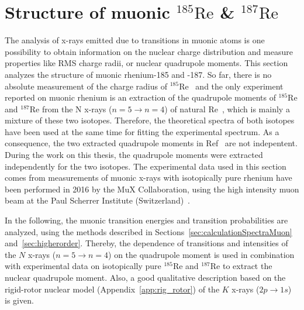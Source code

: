 \section{Structure of muonic $^{185}\text{Re}$ \& $^{187}\text{Re}$}
\label{sec:muon_re}
The analysis of x-rays emitted due to transitions in muonic atoms is one possibility to obtain information on the nuclear charge distribution and measure properties like RMS charge radii, or nuclear quadrupole moments. This section analyzes the structure of muonic rhenium-185 and -187. So far, there is no absolute measurement of the charge radius of $^{185}$Re~\cite{schopper2004} and the only experiment reported on muonic rhenium is an extraction of the quadrupole moments of $^{185}$Re and $^{187}$Re from the N x-rays (${n}{=}{5}\rightarrow{n}{=}{4}$) of natural Re~\cite{konijn1979}, which is mainly a mixture of these two isotopes. Therefore, the theoretical spectra of both isotopes have been used at the same time for fitting the experimental spectrum. As a consequence, the two extracted quadrupole moments in Ref~\cite{konijn1979} are not indepentent. During the work on this thesis, the quadrupole moments were extracted independently for the two isotopes.
The experimental data used in this section comes from measurements of muonic x-rays with isotopically pure rhenium have been performed in 2016 by the MuX Collaboration, using the high intensity muon beam at the Paul Scherrer Institute (Switzerland)~\cite{psiExperiments,psiFacilities}.

In the following, the muonic transition energies and transition probabilities are analyzed, using the methods described in Sections~\ref{sec:calculationSpectraMuon} and~\ref{sec:higherorder}. Thereby, the dependence of transitions and intensities of the $N$ x-rays ($n=5\rightarrow n=4$) on the quadrupole moment is used in combination with experimental data on isotopically pure $^{185}$Re and $^{187}$Re to extract the nuclear quadrupole moment. Also, a good qualitative description based on the rigid-rotor nuclear model (Appendix~\ref{app:rig_rotor}) of the $K$ x-rays ($2p\rightarrow 1s$) is given.


